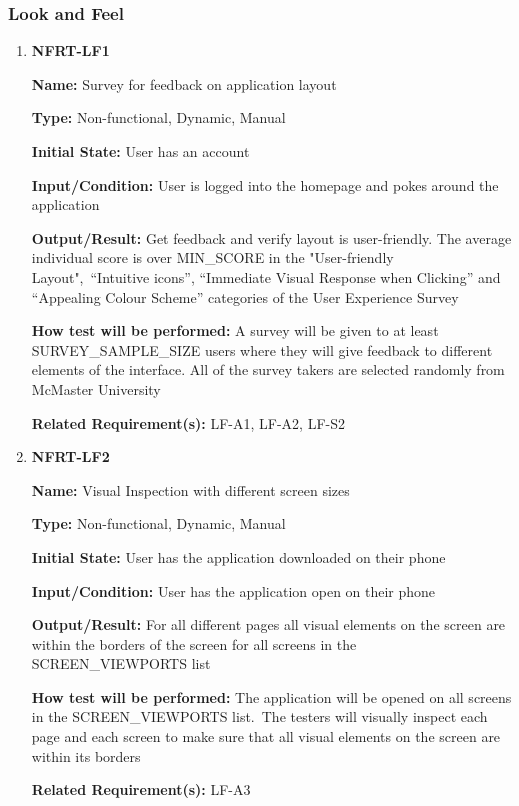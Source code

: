 \documentclass[12pt, titlepage]{article}
\begin{document}
\subsubsection{Look and Feel}

\begin{enumerate}
\item{\textbf{NFRT-LF1}}

\textbf{Name:} Survey for feedback on application layout

\textbf{Type:} Non-functional, Dynamic, Manual
					
\textbf{Initial State:} User has an account

\textbf{Input/Condition:} User is logged into the homepage and pokes around the application
					
\textbf{Output/Result:} Get feedback and verify layout is user-friendly. The average individual score is over MIN\_SCORE in the "User-friendly Layout",\
``Intuitive icons'', ``Immediate Visual Response when Clicking'' and ``Appealing Colour Scheme'' categories of the User Experience Survey
					
\textbf{How test will be performed:} A survey will be given to at least
SURVEY\_SAMPLE\_SIZE users where they will give feedback to different elements of the interface. All of the survey takers are selected randomly from McMaster University

\textbf{Related Requirement(s):} LF-A1, LF-A2, LF-S2

\item{\textbf{NFRT-LF2}}

\textbf{Name:} Visual Inspection with different screen sizes

\textbf{Type:} Non-functional, Dynamic, Manual
					
\textbf{Initial State:} User has the application downloaded on their phone
					
\textbf{Input/Condition:} User has the application open on their phone
					
\textbf{Output/Result:} For all different pages all visual elements on the screen are within the borders of the screen for all screens in the SCREEN\_VIEWPORTS list

\textbf{How test will be performed:} The application will be opened on all screens in the SCREEN\_VIEWPORTS list.\
The testers will visually inspect each page and each screen to make sure that all visual elements on the screen are within its borders

\textbf{Related Requirement(s):} LF-A3


\end{enumerate}
\end{document}
